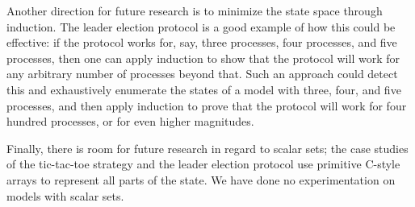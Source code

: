 Another direction for future research is to minimize the state space through
induction.
The leader election protocol is a good example of how this could be effective:
if the protocol works for, say, three processes, four processes,
and five processes, then one can apply induction to show that the protocol will
work for any arbitrary number of processes beyond that.
Such an approach could detect this and exhaustively enumerate the states of
a model with three, four, and five processes, and then apply induction to prove
that the protocol will work for four hundred processes, or for even higher
magnitudes.

Finally, there is room for future research in regard to scalar sets;
the case studies of the tic-tac-toe strategy and the leader election protocol
use primitive C-style arrays to represent all parts of the state.
We have done no experimentation on models with scalar sets.
